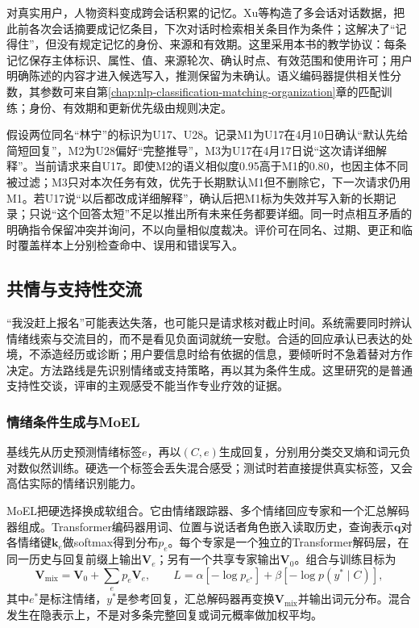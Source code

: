 对真实用户，人物资料变成跨会话积累的记忆。Xu等构造了多会话对话数据，把此前各次会话摘要成记忆条目，下次对话时检索相关条目作为条件；这解决了“记得住”，但没有规定记忆的身份、来源和有效期。这里采用本书的教学协议：每条记忆保存主体标识、属性、值、来源轮次、确认时点、有效范围和使用许可；用户明确陈述的内容才进入候选写入，推测保留为未确认。语义编码器提供相关性分数，其参数可来自第\ref{chap:nlp-classification-matching-organization}章的匹配训练；身份、有效期和更新优先级由规则决定。

假设两位同名“林宁”的标识为U17、U28。记录M1为U17在4月10日确认“默认先给简短回复”，M2为U28偏好“完整推导”，M3为U17在4月17日说“这次请详细解释”。当前请求来自U17。即使M2的语义相似度0.95高于M1的0.80，也因主体不同被过滤；M3只对本次任务有效，优先于长期默认M1但不删除它，下一次请求仍用M1。若U17说“以后都改成详细解释”，确认后把M1标为失效并写入新的长期记录；只说“这个回答太短”不足以推出所有未来任务都要详细。同一时点相互矛盾的明确指令保留冲突并询问，不以向量相似度裁决。评价可在同名、过期、更正和临时覆盖样本上分别检查命中、误用和错误写入。

\subsection{共情与支持性交流}
\label{sec:nlp-dialogue-empathy}

“我没赶上报名”可能表达失落，也可能只是请求核对截止时间。系统需要同时辨认情绪线索与交流目的，而不是看见负面词就统一安慰。合适的回应承认已表达的处境，不添造经历或诊断；用户要信息时给有依据的信息，要倾听时不急着替对方作决定。方法路线是先识别情绪或支持策略，再以其为条件生成。这里研究的是普通支持性交谈，评审的主观感受不能当作专业疗效的证据。

\subsubsection{情绪条件生成与MoEL}
\label{sec:nlp-dialogue-moel}

基线先从历史预测情绪标签$e$，再以$(C,e)$生成回复，分别用分类交叉熵和词元负对数似然训练。硬选一个标签会丢失混合感受；测试时若直接提供真实标签，又会高估实际的情绪识别能力。

MoEL把硬选择换成软组合。它由情绪跟踪器、多个情绪回应专家和一个汇总解码器组成。Transformer编码器用词、位置与说话者角色嵌入读取历史，查询表示$\bm{q}$对各情绪键$\bm{k}_e$做softmax得到分布$p_e$。每个专家是一个独立的Transformer解码层，在同一历史与回复前缀上输出$\bm{V}_e$；另有一个共享专家输出$\bm{V}_0$。组合与训练目标为
\begin{equation}
 \bm{V}_{\mathrm{mix}}=\bm{V}_0+\sum_e p_e\bm{V}_e,
 \qquad
 L=\alpha[-\log p_{e^*}]+\beta[-\log p(y^*\mid C)],
 \label{eq:nlp-dialogue-moel}
\end{equation}
其中$e^*$是标注情绪，$y^*$是参考回复，汇总解码器再变换$\bm{V}_{\mathrm{mix}}$并输出词元分布。混合发生在隐表示上，不是对多条完整回复或词元概率做加权平均。

